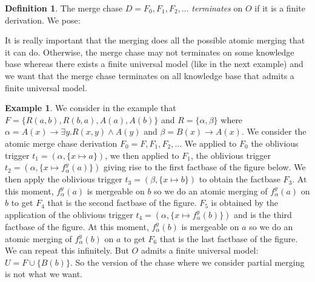 \documentclass{article}
\theoremstyle{definition}
\newtheorem{definition}{Definition}[section]
\newtheorem{example}{Example}[section]
\theoremstyle{remark}
\begin{document}
\begin{definition}
The merge chase $D=F_0,F_1,F_2,\ldots$ \emph{terminates} on $O$ if it is a finite derivation. We pose: \todo{}
\end{definition}




It is really important that the merging does all the possible atomic merging that it can do. Otherwise, the merge chase may not terminates on some knowledge base whereas there exists a finite universal model (like in the next example) and we want that the merge chase terminates on all knowledge base that admits a finite universal model.

\begin{example} \label{necessity of atomic merge}
We consider in the example that $F= \{R(a,b),R(b,a),A(a),A(b)\}$ and $R = \{\alpha, \beta\}$ where $\alpha = A(x) \rightarrow \exists y.R(x,y) \wedge A(y)$ and $\beta=B(x) \rightarrow A(x)$. We consider the atomic merge chase derivation $F_0 =F,F_1,F_2,...$ We applied to $F_0$ the oblivious trigger $t_1 = (\alpha, \{x \mapsto a\})$, we then applied to $F_1$, the oblivious trigger $t_2 = (\alpha, \{x \mapsto f_\alpha^y(a)\})$ giving rise to the first factbase of the figure below. We then apply the oblivious trigger $t_3 = (\beta, \{x \mapsto b\})$ to obtain the factbase $F_3$. At this moment, $f_\alpha^y(a)$ is mergeable on $b$ so we do an atomic merging of $f_\alpha^y(a)$ on $b$ to get $F_4$ that is the second factbase of the figure. $F_5$ is obtained by the application of the oblivious trigger $t_4 = (\alpha, \{x \mapsto f_\alpha^y(b)\})$ and is the third factbase of the figure. At this moment, $f_\alpha^y(b)$ is mergeable on $a$ so we do an atomic merging of $f_\alpha^y(b)$ on $a$ to get $F_6$ that is the last factbase of the figure. We can repeat this infinitely. But $O$ admits a finite universal model: $U = F \cup \{B(b)\}$. So the version of the chase where we consider partial merging is not what we want.


\end{example}
\end{document}
